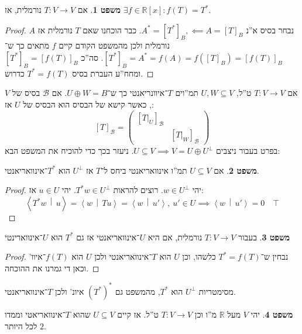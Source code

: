 \documentclass[a4paper]{article}
\newcommand\R     {\mathbb{R}}
\newcommand\bc    {\mathcal{B}}
\newcommand\ra    {\rangle}
\newcommand\la    {\langle}
\newcommand\co        {\colon}
\newcommand\pms[1]    {\begin{pmatrix}
		#1
\end{pmatrix}}
\newcommand\mut [2]   {\left \la #1 \,\middle|\, #2 \right \ra}
\theoremstyle{definition}
\newtheorem{Theorem}{\color{myblue}משפט}
\newcommand\theo  [1] {\begin{Theorem}#1\end{Theorem}}
\begin{document}
	\theo{אם $T \co V \to V$ נורמלית, אז $\exists f \in \R[x] \co f(T) = T^*$. }
	\begin{proof}
		נבחר בסיס א''נ $A^* = [T^*]_B, \impliedby A = [T]_B$. כבר הוכחנו שאם $T$ נורמלית אז $A$ נורמלית ולכן מהמשפט הקודם קיים $f$ מתאים כך ש־$[T^*]_B = A^* = f(A) = f([T]_B) = [f(T)]_B$. סה''כ $[T^*]_B = [f(T)]_B$ ומחח''ע העברת בסיס $T^* = f(T)$ כדרוש. 
	\end{proof}
	
	אם $T \co V \to V$ ט''ל, $U, W \subseteq V$ תמ''וים $T$־איוונריאנטי כך ש־$U \oplus W = B$. אם $\bc$ בסיס של $V$, כאשר קישא של הבסיס הוא הבסיס של $U$ אז: 
	\[ [T]_\bc = \pms{[T|_U]_\bc &  \\  & [T|_W]_\bc} \]
	בפרט בעבור ניצבים $U \subseteq V \implies V = U \oplus U^{\perp}$. ניעזר בכך כדי להוכיח את המשפט הבא: 
	\theo{אם $U \subseteq V$ תמ''ו אינוואריאנטי ביחס ל־$T$ אז $U^{\perp}$ הוא $T^*$־אינוואריאנטי. }\begin{proof}
		יהי $w \in U^{\perp}$. רוצים להראות $T^*w \in U^{\perp}$. יהי $u \in U$ אז: 
		\[ \mut{T^* w}{u} = \mut{w}{Tu} = \mut{w}{u'}, \ u' \in U \implies \mut{w}{u'} = 0 \quad \top \]
	\end{proof}
	\theo{בעבור $T \co V \to V$ נורמלית, אם היא $U$־אינוואריאנטי אז גם $T^*$ הוא $U$־אינווארינטי}
	\begin{proof}
		נבחין ש־$T^* = f(T)$ כלשהו, וכן $U$ הוא $T$־אינוואריאנטי ולכן $U$ הוא $f(T)$־איוו' וכאן די גמרנו את ההוכחה. 
	\end{proof}
	מסימטריות $U^{\perp}$ הוא $T^*$, מהמשפט גם $(T^*)^*$ איונ' ולכן $T$־אינוואריאנטי. 
	
	\theo{יהי $V$ מעל $\R$ מ''ו וכן $T \co V \to V$ ט''ל. אז קיים $U \subseteq V$ שהוא $T$־אינוואריאטי וממדו לכל היותר $2$. }
	
\end{document}
